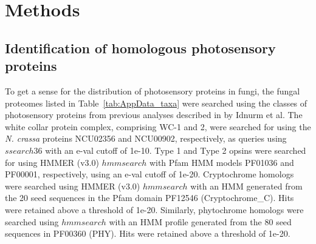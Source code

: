 \section{Methods}

\subsection*{Identification of homologous photosensory proteins}
To get a sense for the distribution of photosensory proteins in fungi, the fungal proteomes listed in Table~\ref{tab:AppData_taxa} were searched using the classes of photosensory proteins from previous analyses described in by Idnurm et al. The white collar protein complex, comprising WC-1 and 2, were searched for using the \textit{N. crassa} proteins NCU02356 and NCU00902, respectively, as queries using $ssearch36$ with an e-val cutoff of 1e-10. Type 1 and Type 2 opsins were searched for using HMMER (v3.0) $hmmsearch$ with Pfam HMM models PF01036 and PF00001, respectively, using an e-val cutoff of 1e-20. Cryptochrome homologs were searched using HMMER (v3.0) $hmmsearch$ with an HMM generated from the 20 seed sequences in the Pfam domain PF12546 (Cryptochrome\_C). Hits were retained above a threshold of 1e-20. Similarly, phytochrome homologs were searched using $hmmsearch$ with an HMM profile generated from the 80 seed sequences in PF00360 (PHY). Hits were retained above a threshold of 1e-20.\\

